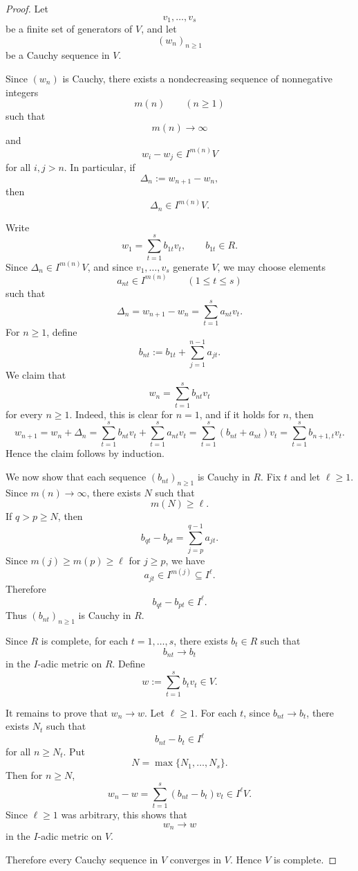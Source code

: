 \begin{proof}
    Let
    \[
        v_1,\dots,v_s
    \]
    be a finite set of generators of \(V\), and let
    \[
        (w_n)_{n\geq 1}
    \]
    be a Cauchy sequence in \(V\).

    Since \((w_n)\) is Cauchy, there exists a nondecreasing sequence of nonnegative
    integers
    \[
        m(n)\qquad (n\geq 1)
    \]
    such that
    \[
        m(n)\longrightarrow \infty
    \]
    and
    \[
        w_i-w_j\in I^{m(n)}V
    \]
    for all \(i,j>n\). In particular, if
    \[
        \Delta_n:=w_{n+1}-w_n,
    \]
    then
    \[
        \Delta_n\in I^{m(n)}V.
    \]

    Write
    \[
        w_1=\sum_{t=1}^s b_{1t}v_t,
        \qquad b_{1t}\in R.
    \]
    Since \(\Delta_n\in I^{m(n)}V\), and since \(v_1,\dots,v_s\) generate \(V\), we may
    choose elements
    \[
        a_{nt}\in I^{m(n)}
        \qquad (1\leq t\leq s)
    \]
    such that
    \[
        \Delta_n=w_{n+1}-w_n=\sum_{t=1}^s a_{nt}v_t.
    \]
    For \(n\geq 1\), define
    \[
        b_{nt}:=b_{1t}+\sum_{j=1}^{n-1}a_{jt}.
    \]
    We claim that
    \[
        w_n=\sum_{t=1}^s b_{nt}v_t
    \]
    for every \(n\geq 1\). Indeed, this is clear for \(n=1\), and if it holds for
    \(n\), then
    \[
        w_{n+1}
        =
        w_n+\Delta_n
        =
        \sum_{t=1}^s b_{nt}v_t+\sum_{t=1}^s a_{nt}v_t
        =
        \sum_{t=1}^s (b_{nt}+a_{nt})v_t
        =
        \sum_{t=1}^s b_{n+1,t}v_t.
    \]
    Hence the claim follows by induction.

    We now show that each sequence \((b_{nt})_{n\geq 1}\) is Cauchy in \(R\). Fix
    \(t\) and let \(\ell\geq 1\). Since \(m(n)\to\infty\), there exists \(N\) such that
    \[
        m(N)\geq \ell.
    \]
    If \(q>p\geq N\), then
    \[
        b_{qt}-b_{pt}
        =
        \sum_{j=p}^{q-1}a_{jt}.
    \]
    Since \(m(j)\geq m(p)\geq \ell\) for \(j\geq p\), we have
    \[
        a_{jt}\in I^{m(j)}\subseteq I^\ell.
    \]
    Therefore
    \[
        b_{qt}-b_{pt}\in I^\ell.
    \]
    Thus \((b_{nt})_{n\geq 1}\) is Cauchy in \(R\).

    Since \(R\) is complete, for each \(t=1,\dots,s\), there exists \(b_t\in R\) such that
    \[
        b_{nt}\longrightarrow b_t
    \]
    in the \(I\)-adic metric on \(R\). Define
    \[
        w:=\sum_{t=1}^s b_tv_t\in V.
    \]

    It remains to prove that \(w_n\to w\). Let \(\ell\geq 1\). For each \(t\), since
    \(b_{nt}\to b_t\), there exists \(N_t\) such that
    \[
        b_{nt}-b_t\in I^\ell
    \]
    for all \(n\geq N_t\). Put
    \[
        N=\max\{N_1,\dots,N_s\}.
    \]
    Then for \(n\geq N\),
    \[
        w_n-w
        =
        \sum_{t=1}^s (b_{nt}-b_t)v_t
        \in I^\ell V.
    \]
    Since \(\ell\geq 1\) was arbitrary, this shows that
    \[
        w_n\longrightarrow w
    \]
    in the \(I\)-adic metric on \(V\).

    Therefore every Cauchy sequence in \(V\) converges in \(V\). Hence \(V\) is complete.
\end{proof}
